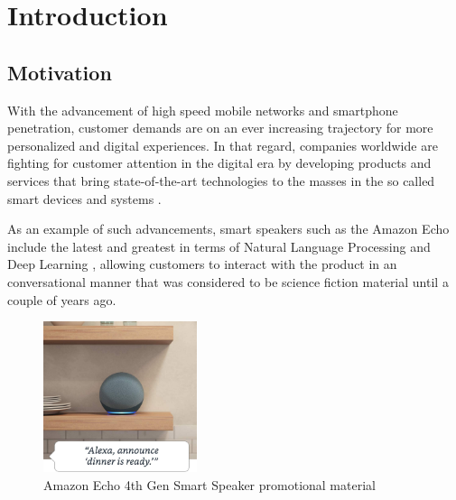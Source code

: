 \documentclass[openright]{normas-utf-tex} %
\begin{document}
\listadefiguras %
\listadetabelas %
\listadesiglas %

\sumario %
%
%
%
%

\setcounter{page}{12}

\chapter{Introduction}

\section{Motivation}

With the advancement of high speed mobile networks and smartphone penetration,
customer demands are on an ever increasing trajectory for more personalized and
digital experiences. In that regard, companies worldwide are fighting for
customer attention in the digital era by developing products and services that
bring state-of-the-art technologies to the masses in the so called smart
devices and systems \cite{Shafique2020}.

As an example of such advancements, smart speakers such as the Amazon Echo
\cite{GaoPanWangChen2018} include the latest and greatest in terms of Natural
Language Processing and Deep Learning \cite{Young2018}, allowing customers to
interact with the product in an conversational manner that was considered to be
science fiction material until a couple of years ago.

\begin{figure}[!htb]
	\centering
	\includegraphics[width=0.4\textwidth]{./images/echodot4.jpg} %
	\caption[Amazon Echo 4th Generation smart speaker promotional material]{Amazon Echo 4th Gen Smart Speaker promotional material}
	\label{fig:echodot4}
\end{figure}
\end{document}
